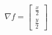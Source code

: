 \documentclass[preview]{standalone}
\begin{document}
\begin{align*}
\nabla f = \begin{bmatrix} \frac{x}{2} \\ \frac{y}{2} \end{bmatrix}
\end{align*}
\end{document}
